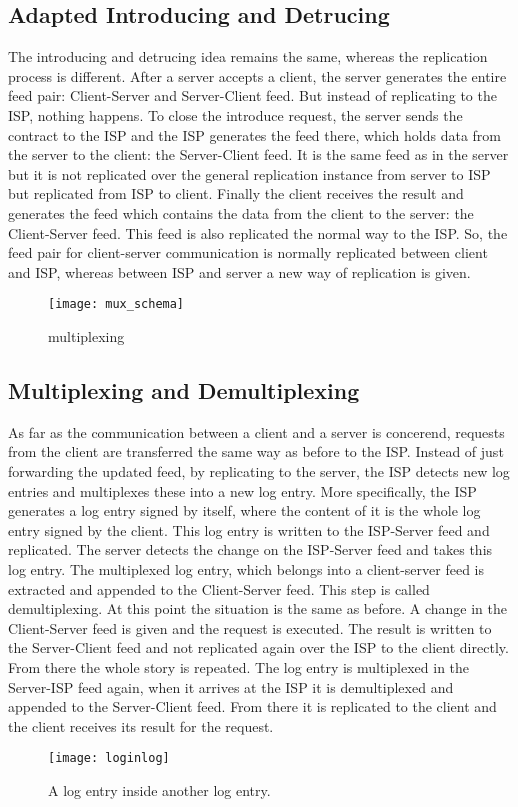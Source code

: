 \subsection{Adapted Introducing and Detrucing}
The introducing and detrucing idea remains the same, whereas the replication process is different. After a server accepts a client, the server generates the entire feed pair: Client-Server and Server-Client feed. But instead of replicating to the ISP, nothing happens. To close the introduce request, the server sends the contract to the ISP and the ISP generates the feed there, which holds data from the server to the client: the Server-Client feed. It is the same feed as in the server but it is not replicated over the general replication instance from server to ISP but replicated from ISP to client. Finally the client receives the result and generates the feed which contains the data from the client to the server: the Client-Server feed. This feed is also replicated the normal way to the ISP. So, the feed pair for client-server communication is normally replicated between client and ISP, whereas between ISP and server a new way of replication is given.

\begin{figure}
    \centering
    \texttt{[image: mux\_schema]}
    \caption{multiplexing}
    \label{fig:mux}
\end{figure}

\subsection{Multiplexing and Demultiplexing}
As far as the communication between a client and a server is concerend, requests from the client are transferred the same way as before to the ISP. Instead of just forwarding the updated feed, by replicating to the server, the ISP detects new log entries and multiplexes these into a new log entry.
More specifically, the ISP generates a log entry signed by itself, where the content of it is the whole log entry signed by the client. This log entry is written to the ISP-Server feed and replicated. The server detects the change on the ISP-Server feed and takes this log entry. The multiplexed log entry, which belongs into a client-server feed is extracted and appended to the Client-Server feed. This step is called demultiplexing. At this point the situation is the same as before. A change in the Client-Server feed is given and the request is executed. The result is written to the Server-Client feed and not replicated again over the ISP to the client directly. From there the whole story is repeated. The log entry is  multiplexed in the Server-ISP feed again, when it arrives at the ISP it is demultiplexed and appended to the Server-Client feed. From there it is replicated to the client and the client receives its result for the request.
\begin{figure}
    \centering
    \texttt{[image: loginlog]}
    \caption{A log entry inside another log entry.}
    \label{fig:loginlog}
\end{figure}


